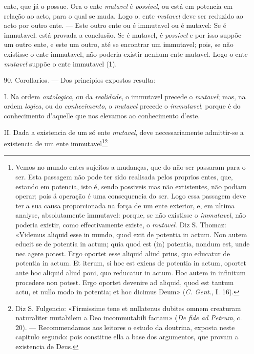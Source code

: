  ente, que já o possue. Ora o ente \emph{mutavel} é \emph{possivel}, ou está em potencia em relação ao acto, para o qual se muda. Logo o. ente \emph{mutavel} deve ser reduzido ao acto por outro ente. --- Este outro ente ou é immutavel ou é mutavel: Se é immutavel. está provada a conclusão. Se é mutavel, é \emph{possivel} e por isso suppõe um outro ente, e este um outro, até se encontrar um immutavel; pois, se não existisse o ente immutavel, não poderia existir nenhum ente mutavel. Logo o ente \emph{mutavel} suppõe o ente immutavel (1).

90. Corollarios. --- Dos principios expostos resulta:

I. Na ordem \emph{ontologica}, ou da \emph{realidade}, o immutavel precede o \emph{mutavel}; mas, na ordem \emph{logica}, ou do \emph{conhecimento}, o \emph{mutavel} precede o \emph{immutavel}, porque é do conhecimento d'aquelle que nos elevamos ao conhecimento d'este.

II. Dada a existencia de um só ente \emph{mutavel}, deve necessariamente admittir-se a existencia de um ente immutavel\footnote{Vemos no mundo entes sujeitos a mudanças, que do não-ser passaram para o ser. Esta passagem não pode ter sido realisada pelos proprios entes, que, estando em potencia, isto é, sendo possiveis mas não extistentes, não podiam operar; pois á operação é uma consequencia do ser. Logo essa passagem deve ter a sua causa proporcionada na força de um ente exterior, e, em ultima analyse, absolutamente immutavel: porque, se não existisse o \emph{immutavel}, não poderia existir, como effectivamente existe, o \emph{mutavel}. Diz S. Thomaz: «Videmus aliquid esse in mundo, quod exit de potentia in actum. Non autem educit se de potentia in actum; quia quod est (in) potentia, nondum est, unde nec agere potest. Ergo oportet esse aliquid aliud prius, quo educatur de potentia in actum. Et iterum, si hoc est exiens de potentia in actum, oportet ante hoc aliquid aliud poni, quo reducatur in actum. Hoc autem in infinitum procedere non potest. Ergo oportet devenire ad aliquid, quod est tantum actu, et nullo modo in potentia; et hoc dicimus Deum» (\emph{C. Gent.}, I. 16).}\footnote{Diz S. Fulgencio: «Firmissime tene et nullatenus dubites omnem creaturam naturaliter mutabilem a Deo incommutabili factam» (\emph{De fide ad Petrum}, c. 20). --- Recommendamos aos leitores o estudo da doutrina, exposta neste capitulo segundo: pois constitue ella a base dos argumentos, que provam a existencia de Deus.}
